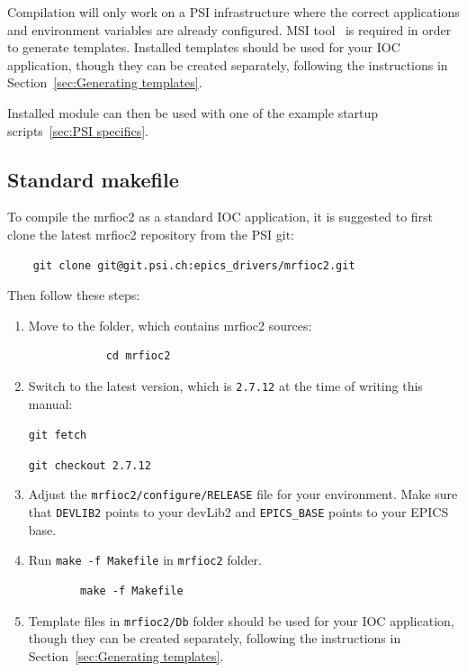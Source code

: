 \documentclass[12pt,a4paper]{article}
\newcommand{\latestDriverVersion}{2.7.12}
\begin{document}
Compilation will only work on a PSI infrastructure where the correct applications and environment variables are already configured. MSI tool~\cite{msi} is required in order to generate templates. Installed templates should be used for your IOC application, though they can be created separately, following the instructions in Section~\ref{sec:Generating templates}.

Installed module can then be used with one of the example startup scripts~\ref{sec:PSI specifics}.

\subsection{Standard makefile}\label{sec:Standard makefile}
To compile the mrfioc2 as a standard IOC application, it is suggested to first clone the latest mrfioc2 repository from the PSI git: 
\begin{verbatim}
	git clone git@git.psi.ch:epics_drivers/mrfioc2.git
\end{verbatim}

Then follow these steps:
\begin{enumerate}
	\item 
		Move to the folder, which contains mrfioc2 sources:
		\begin{verbatim}
			cd mrfioc2
		\end{verbatim}
		
	\item 
		Switch to the latest version, which is \texttt{\latestDriverVersion} at the time of writing this manual:
		
		\texttt{git fetch}
		
		\texttt{git checkout \latestDriverVersion}
		
	\item 
		Adjust the \texttt{mrfioc2/configure/RELEASE} file for your environment. Make sure that \texttt{DEVLIB2} points to your devLib2 and \texttt{EPICS\_BASE} points to your EPICS base.
	\item 
		Run \texttt{make -f Makefile} in \texttt{mrfioc2} folder.
		\begin{verbatim}
		make -f Makefile
		\end{verbatim}
	\item 
		Template files in \texttt{mrfioc2/Db} folder should be used for your IOC application, though they can be created separately, following the instructions in Section~\ref{sec:Generating templates}.
\end{enumerate}
\end{document}
